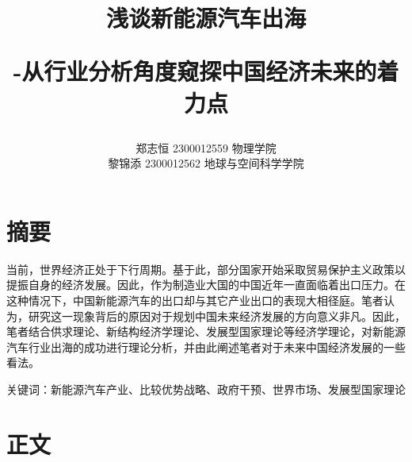 \documentclass[a4paper, 10pt]{article}
\begin{document}
  \title{{\huge \textbf {浅谈新能源汽车出海}}
  
  {\LARGE -从行业分析角度窥探中国经济未来的着力点}}
  \author{郑志恒  2300012559  物理学院\\ 黎锦添  2300012562  地球与空间科学学院}
  \date{}
  
  \maketitle
  \section{摘要}
  当前，世界经济正处于下行周期。基于此，部分国家开始采取贸易保护主义政策以提振自身的经济发展。因此，作为制造业大国的中国近年一直面临着出口压力。在这种情况下，中国新能源汽车的出口却与其它产业出口的表现大相径庭。笔者认为，研究这一现象背后的原因对于规划中国未来经济发展的方向意义非凡。因此，笔者结合供求理论、新结构经济学理论、发展型国家理论等经济学理论，对新能源汽车行业出海的成功进行理论分析，并由此阐述笔者对于未来中国经济发展的一些看法。
  
  \vspace{10pt}
  \noindent 关键词：新能源汽车产业、比较优势战略、政府干预、世界市场、发展型国家理论
  \section{正文}
\end{document}
